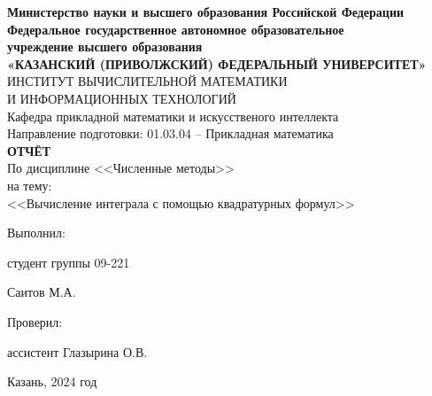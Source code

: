 \documentclass[a4paper,12pt]{article}
\begin{document}
\begin{center}
\hfill \break
\textbf{\large{Министерство науки и высшего образования Российской Федерации\\
Федеральное государственное автономное образовательное\\
учреждение высшего образования}}
\\
\large{\textbf{«КАЗАНСКИЙ (ПРИВОЛЖСКИЙ) ФЕДЕРАЛЬНЫЙ УНИВЕРСИТЕТ»}}\\
\hfill \break
\large{ИНСТИТУТ ВЫЧИСЛИТЕЛЬНОЙ МАТЕМАТИКИ\\ И ИНФОРМАЦИОННЫХ ТЕХНОЛОГИЙ}\\
 \hfill \break
\large{Кафедра прикладной математики и искусственого интеллекта}\\
\hfill\break
\hfill \break
\large{Направление подготовки: 01.03.04 – Прикладная математика}\\
\hfill \break
\hfill \break
\textbf{\large{ОТЧЁТ}}\\
\large{По дисциплине <<Численные методы>>}\\
\large{на тему:}\\
\large{<<Вычисление интеграла с помощью квадратурных формул>>}\\
\hfill \break
\hfill \break
\end{center}

\hfill \break
\begin{flushright}
			
    \large{Выполнил:}

    \large{студент группы 09-221}
    
    \large{Саитов М.А.}
    
    \large{Проверил:}
    
    \large{ассистент Глазырина О.В.}
    
\end{flushright}
\vfill
\begin{center} \large{Казань, 2024 год} \end{center}
\thispagestyle{empty}
 
\end{document}
